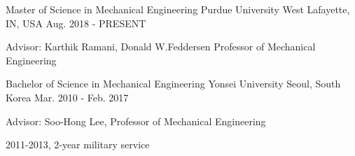 


\begin{cventries}


    \cventry
    {Master of Science in Mechanical Engineering} %
    {Purdue University} %
    {West Lafayette, IN, USA} %
    {Aug. 2018 - PRESENT} %
    { %
    \begin{cvitems}
        \item {Advisor: Karthik Ramani, Donald W.Feddersen Professor of Mechanical Engineering}
    \end{cvitems}
    }

    \cventry
    {Bachelor of Science in Mechanical Engineering} %
    {Yonsei University} %
    {Seoul, South Korea} %
    {Mar. 2010 - Feb. 2017} %
    { %
    \begin{cvitems}
        \item {Advisor: Soo-Hong Lee, Professor of Mechanical Engineering}
        \item {2011-2013, 2-year military service}
    \end{cvitems}
    }

\end{cventries}
